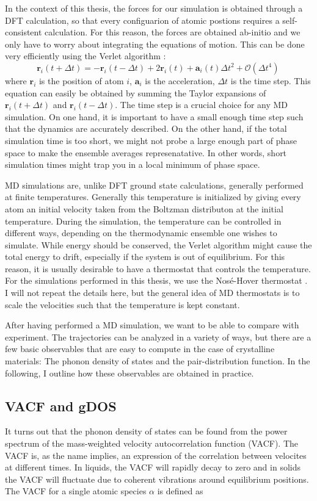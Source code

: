 In the context of this thesis, the forces for our simulation is obtained through a DFT calculation, so that every configuarion of atomic postions requires a self-consistent calculation. For this reason, the forces are obtained ab-initio and we only have to worry about integrating the equations of motion. This can be done very efficiently using the Verlet algorithm \cite{Verlet1967}:
%
\[ \bm{r}_i(t+\Delta t) = - \bm{r}_i(t-\Delta t) + 2 \bm{r}_i(t) + \bm{a}_i (t) \Delta t^2 + \mathcal{O}(\Delta t^4) \, \]
%
where $\bm{r}_i$ is the position of atom $i$, $\bm{a}_i$ is the acceleration, $\Delta t$ is the time step. This equation can easily be obtained by summing the Taylor expansions of $\bm{r}_i(t+\Delta t)$ and $\bm{r}_i(t-\Delta t)$. The time step is a crucial choice for any MD simulation. On one hand, it is important to have a small enough time step such that the dynamics are accurately described. On the other hand, if the total simulation time is too short, we might not probe a large enough part of phase space to make the ensemble averages represenatative. In other words, short simulation times might trap you in a local minimum of phase space.

MD simulations are, unlike DFT ground state calculations, generally performed at finite temperatures. Generally this temperature is initialized by giving every atom an initial velocity taken from the Boltzman distributon at the initial temperature. During the simulation, the temperature can be controlled in different ways, depending on the thermodynamic ensemble one wishes to simulate. While energy should be conserved, the Verlet algorithm might cause the total energy to drift, especially if the system is out of equilibrium. For this reason, it is usually desirable to have a thermostat that controls the temperature. For the simulations performed in this thesis, we use the Nos\'e-Hover thermostat \cite{Nose1984}. I will not repeat the details here, but the general idea of MD thermostats is to scale the velocities such that the temperature is kept constant.

After having performed a MD simulation, we want to be able to compare with experiment. The trajectories can be analyzed in a variety of ways, but there are a few basic observables that are easy to compute in the case of crystalline materials: The phonon density of states and the pair-distribution function.  In the following, I outline how these observables are obtained in practice.

\subsection{VACF and gDOS}
It turns out \cite{Dove1993} that the phonon density of states can be found from the power spectrum of the mass-weighted velocity autocorrelation function (VACF). The VACF is, as the name implies, an expression of the correlation between velocites at different times. In liquids, the VACF will rapidly decay to zero and in solids the VACF will fluctuate due to coherent vibrations around equilibrium positions. The VACF for a single atomic species $\alpha$ is defined as

